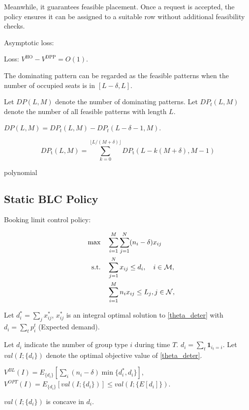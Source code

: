 Meanwhile, it guarantees feasible placement. Once a request is accepted, the policy ensures it can be assigned to a suitable row without additional feasibility checks.

Asymptotic loss:
\begin{lem}
    Loss: $V^{\text{HO}} - V^{\text{DPP}} = O(1)$. 
\end{lem}

The dominating pattern can be regarded as the feasible patterns when the number of occupied seats is in $[L-\delta, L]$.

Let $DP(L, M)$ denote the number of dominating patterns. Let $DP_{t} (L, M)$ denote the number of all feasible patterns with length $L$.

$DP(L, M) = DP_{t} (L, M) - DP_{t} (L-\delta-1, M)$.

\begin{equation}
DP_{\text {t}}(L, M)=\sum_{k=0}^{\lfloor L /(M+\delta)\rfloor} D P_{\text {t}}(L-k(M+\delta), M-1)
\end{equation}

polynomial

\newpage

\subsection{Static BLC Policy}
Booking limit control policy:

\begin{align}
    \quad \max \quad & \sum_{i=1}^{M}  \sum_{j= 1}^{N} (n_i - \delta) x_{ij} \label{theta_deter} \\
    \text {s.t.} \quad & \sum_{j= 1}^{N} x_{ij} \leq d_{i}, \quad i \in \mathcal{M}, \notag \\ 
    & \sum_{i=1}^{M} n_{i} x_{ij} \leq L_j, j \in \mathcal{N}, \notag 
\end{align}

Let $d_{i}^{*} = \sum_{j} x_{ij}^{*}$, $x_{ij}^{*}$ is an integral optimal solution to \eqref{theta_deter} with $d_{i} = \sum_{t} p_{i}^{t}$ (Expected demand).

Let $d_{i}$ indicate the number of group type $i$ during time $T$. $d_{i} = \sum_{t} \bm{1}_{i_{t} = i}$.
Let $val(I; \{d_{i}\})$ denote the optimal objective value of \eqref{theta_deter}.

$V^{BL}(I) = E_{\{d_{i}\}}[\sum_{i} (n_{i}-\delta) \min\{d_{i}^{*}, d_{i}\}]$, $V^{OPT}(I) = E_{\{d_{i}\}} [val(I; \{d_{i}\})] \leq val(I; \{E[d_{i}]\})$.

$val(I; \{d_{i}\})$ is concave in $d_{i}$.

